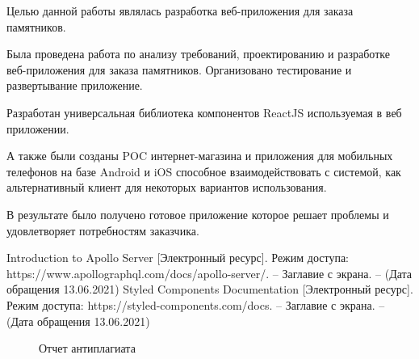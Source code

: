 \documentclass[a4paper,article,14pt]{extarticle}
\begin{document}

Целью данной работы являлась разработка веб-приложения для заказа памятников.

Была проведена работа по анализу требований, проектированию и разработке веб-приложения для заказа памятников.
Организовано тестирование и развертывание приложение.

Разработан универсальная библиотека компонентов ReactJS используемая в веб приложении.

А также были созданы POC интернет-магазина и приложения для мобильных телефонов на базе Android и iOS способное взаимодействовать с системой,
как альтернативный клиент для некоторых вариантов использования.

В результате было получено готовое приложение которое решает проблемы и удовлетворяет потребностям заказчика.
\pagebreak

\begin{thebibliography}{1}
     Introduction to Apollo Server [Электронный ресурс]. Режим доступа: https://www.apollographql.com/docs/apollo-server/. – Заглавие с экрана. – (Дата обращения 13.06.2021)
     Styled Components Documentation [Электронный ресурс]. Режим доступа: https://styled-components.com/docs. – Заглавие с экрана. – (Дата обращения 13.06.2021)
\end{thebibliography}
\pagebreak


\begin{figure}[ht]
\begin{center}
\caption{\label{plg} Отчет антиплагиата}
\end {center}
\end {figure}
\pagebreak
\end{document}
